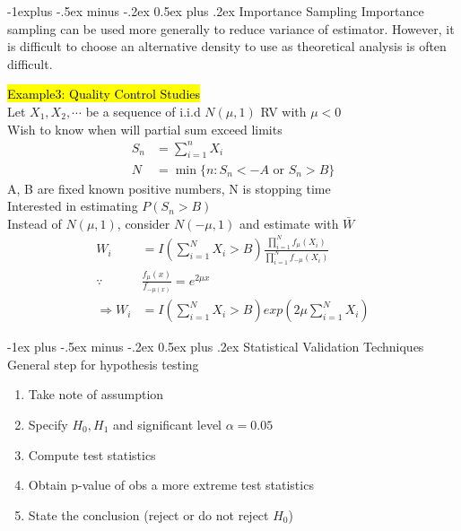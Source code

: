 \documentclass[a4paper,12pt,landscape]{article}
\makeatletter
\renewcommand{\section}{\@startsection{section}{1}{0mm}%
                                {-1ex plus -.5ex minus -.2ex}%
                                {0.5ex plus .2ex}%
                                {\normalfont\large\bfseries\color{red}}}
\renewcommand{\subsection}{\@startsection{subsection}{2}{0mm}%
                                {-1explus -.5ex minus -.2ex}%
                                {0.5ex plus .2ex}%
                                {\normalfont\normalsize\bfseries\color{blue}}}
\makeatother
\begin{document}
\begin{multicols}{3}
    \subsection{Importance Sampling}
    Importance sampling can be used more generally to reduce variance of estimator. 
    However, it is difficult to choose an alternative density to use as theoretical analysis is often difficult.

    \hl{Example3: Quality Control Studies}\\
    Let $X_1, X_2, \cdots$ be a sequence of i.i.d $N(\mu, 1)$ RV with $\mu<0$\\
    Wish to know when will partial sum exceed limits
    \begin{align*}
        S_n &= \sum_{i=1}^n X_i\\
        N &= \min\{n: S_n < -A \text{ or } S_n > B \}
    \end{align*}
    A, B are fixed known positive numbers, N is stopping time\\
    Interested in estimating $P(S_n > B)$\\
    Instead of $N(\mu, 1)$, consider $N(-\mu, 1)$ and estimate with $\bar W$
    \begin{align*}
        W_i &= I\left( \sum_{i=1}^N X_i > B  \right) \frac{\prod_{i=1}^N f_\mu(X_i)}{\prod_{i=1}^Nf_{-\mu}(X_i)}\\
        \because &\frac{f_\mu(x)}{f_{-\mu(x)}}=e^{2\mu x}\\
        \Rightarrow W_i &= I\left( \sum_{i=1}^N X_i > B  \right)exp(2\mu\sum_{i=1}^N X_i)
    \end{align*}

    \section{Statistical Validation Techniques}
    General step for hypothesis testing
    \begin{enumerate}
        \item Take note of assumption
        \item Specify $H_0, H_1$ and significant level $\alpha=0.05$
        \item Compute test statistics
        \item Obtain p-value of obs a more extreme test statistics
        \item State the conclusion (reject or do not reject $H_0$)
    \end{enumerate}


\end{multicols}
\end{document}

